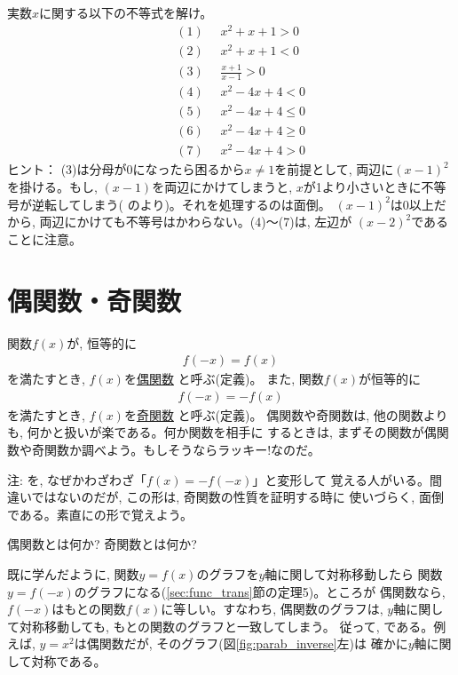 \begin{q}\label{q:alg_ineq2}
実数$x$に関する以下の不等式を解け。 
\begin{eqnarray*}
&&(1)\,\,\,\,\,\,\,\,x^2+x+1>0\\
&&(2)\,\,\,\,\,\,\,\,x^2+x+1<0\\
&&(3)\,\,\,\,\,\,\,\,\frac{x+1}{x-1}>0\\
&&(4)\,\,\,\,\,\,\,\,x^2-4x+4<0\\
&&(5)\,\,\,\,\,\,\,\,x^2-4x+4\leq0\\
&&(6)\,\,\,\,\,\,\,\,x^2-4x+4\geq0\\
&&(7)\,\,\,\,\,\,\,\,x^2-4x+4>0
\end{eqnarray*}
{\small ヒント： (3)は分母が0になったら困るから$x\neq1$を前提として, 
両辺に$(x-1)^2$を掛ける。もし, $(x-1)$を両辺にかけてしまうと, 
$x$が1より小さいときに不等号が逆転してしまう(
のより)。それを処理するのは面倒。
$(x-1)^2$は0以上だから, 両辺にかけても不等号はかわらない。(4)〜(7)は, 左辺が
$(x-2)^2$であることに注意。}
\end{q}


\section{偶関数・奇関数}
関数$f(x)$が, 恒等的に
\begin{eqnarray}f(-x)=f(x)\end{eqnarray}
を満たすとき, $f(x)$を\underline{偶関数} と呼ぶ(定義)。
また, 関数$f(x)$が恒等的に
\begin{eqnarray}f(-x)=-f(x)\label{eq:def_odd_func}\end{eqnarray}
を満たすとき, $f(x)$を\underline{奇関数} と呼ぶ(定義)。
偶関数や奇関数は, 他の関数よりも, 何かと扱いが楽である。何か関数を相手に
するときは, まずその関数が偶関数や奇関数か調べよう。もしそうならラッキー!なのだ。\hv

{\small 注: を, なぜかわざわざ「$f(x)=-f(-x)$」と変形して
覚える人がいる。間違いではないのだが, この形は, 奇関数の性質を証明する時に
使いづらく, 面倒である。素直にの形で覚えよう。}

\begin{q}\label{q:func_evenodd0} 偶関数とは何か? 奇関数とは何か?\end{q}
\mv

既に学んだように, 関数$y=f(x)$のグラフを$y$軸に関して対称移動したら
関数$y=f(-x)$のグラフになる(\ref{sec:func_trans}節の定理5)。ところが
偶関数なら, $f(-x)$はもとの関数$f(x)$に等しい。すなわち, 偶関数のグラフは, 
$y$軸に関して対称移動しても, もとの関数のグラフと一致してしまう。
従って, である。例えば, 
$y=x^2$は偶関数だが, そのグラフ(図\ref{fig:parab_inverse}左)は
確かに$y$軸に関して対称である。

